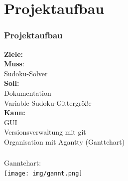 \documentclass{beamer}
\begin{document}
\section{Projektaufbau}
\begin{frame}
	\frametitle{Projektaufbau} 
	\textbf{Ziele:}\\
	\noindent \hspace*{5mm} \textbf{Muss}:\\
	 \noindent \hspace*{10mm}Sudoku-Solver\\
	\noindent \hspace*{5mm} \textbf{Soll:} \\
	\noindent \hspace*{10mm}Dokumentation\\
	\noindent \hspace*{10mm}Variable Sudoku-Gittergröße\\
	\noindent \hspace*{5mm} \textbf{Kann:} \\
	\noindent \hspace*{10mm}GUI\\
	\noindent \hspace*{10mm}Versionsverwaltung mit git\\
	\noindent \hspace*{10mm}Organisation mit Agantty (Ganttchart)
\end{frame}

\begin{frame}
	\frametitle{} 
	Ganntchart:\\
	\centering
	\texttt{[image: img/gannt.png]}
\end{frame}
\end{document}
